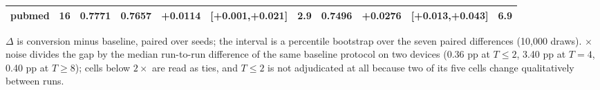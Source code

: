 \begin{table}[t]
\begin{tabular}{lrrrrrrrrrr}
pubmed & 16 & 0.7771 & 0.7657 & +0.0114 & [+0.001,+0.021] & 2.9 & 0.7496 & +0.0276 & [+0.013,+0.043] & 6.9 \\
\bottomrule
\end{tabular}
\par\vspace{2pt}\footnotesize $\Delta$ is conversion minus baseline, paired over seeds; the interval is a percentile bootstrap over the seven paired differences (10{,}000 draws). $\times$noise divides the gap by the median run-to-run difference of the same baseline protocol on two devices (0.36 pp at $T \le 2$, 3.40 pp at $T=4$, 0.40 pp at $T \ge 8$); cells below $2\times$ are read as ties, and $T \le 2$ is not adjudicated at all because two of its five cells change qualitatively between runs.
\end{table}
